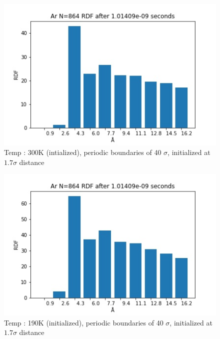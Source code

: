 \documentclass[a4paper,10pt,english]{article}
\begin{document}
\begin{figure}[h!]
        \centering 
        \includegraphics[scale=0.6]{./py/RDF_Task4_di_everything_hot.jpg} 
        \caption{Temp : 300K (intialized), periodic boundaries of 40 $\sigma$, initialized at $1.7\sigma$ distance }
        \label{fig:4di_rdf_plot}
\end{figure}


\begin{figure}[h!]
        \centering 
        \includegraphics[scale=0.6]{./py/RDF_Task4_di_everything.jpg} 
        \caption{Temp : 190K (initialized), periodic boundaries of 40 $\sigma$, initialized at $1.7\sigma$ distance }     %
        \label{fig:4di_rdf_plot}
\end{figure}
\end{document}
